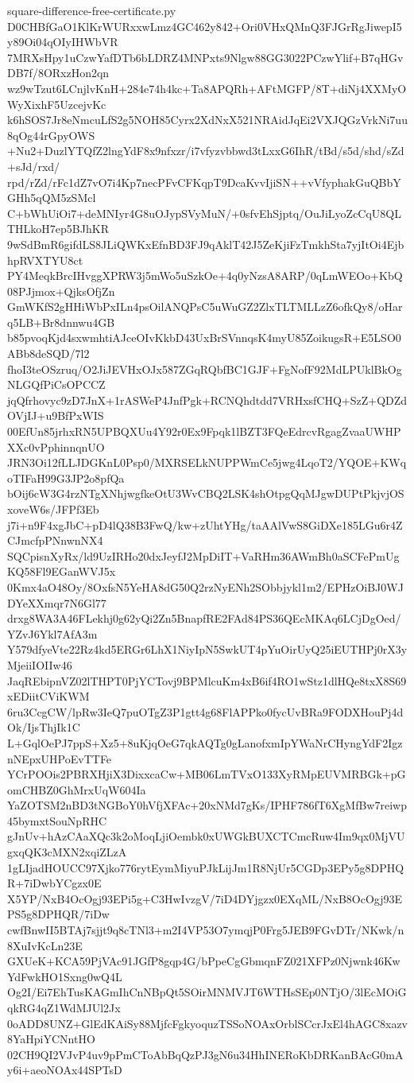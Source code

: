 \documentclass[11pt]{article}
\theoremstyle{definition}
\theoremstyle{remark}
\begin{document}
\begin{filecontents*}[overwrite]{square-difference-free-certificate.py}
D0CHBfGaO1KlKrWURxxwLmz4GC462y842+Ori0VHxQMnQ3FJGrRgJiwepI5y89Oi04qOIyIHWbVR
7MRXsHpy1uCzwYafDTb6bLDRZ4MNPxts9Nlgw88GG3022PCzwYlif+B7qHGvDB7f/8ORxzHon2qn
wz9wTzut6LCnjlvKnH+284e74h4kc+Ta8APQRh+AFtMGFP/8T+diNj4XXMyOWyXixhF5UzcejvKc
k6hSOS7Jr8eNmcuLfS2g5NOH85Cyrx2XdNxX521NRAidJqEi2VXJQGzVrkNi7uu8qOg44rGpyOWS
+Nu2+DuzlYTQfZ2lngYdF8x9nfxzr/i7vfyzvbbwd3tLxxG6IhR/tBd/s5d/shd/sZd+sJd/rxd/
rpd/rZd/rFc1dZ7vO7i4Kp7necPFvCFKqpT9DcaKvvIjiSN++vVfyphakGuQBbYGHh5qQM5zSMcl
C+bWhUiOi7+deMNIyr4G8uOJypSVyMuN/+0sfvEhSjptq/OuJiLyoZcCqU8QLTHLkoH7ep5BJhKR
9wSdBmR6gifdLS8JLiQWKxEfnBD3FJ9qAklT42J5ZeKjiFzTmkhSta7yjItOi4EjbhpRVXTYU8ct
PY4MeqkBrcIHvggXPRW3j5mWo5uSzkOe+4q0yNzsA8ARP/0qLmWEOo+KbQ08PJjmox+QjksOfjZn
GmWKfS2gHHiWbPxILn4psOilANQPsC5uWuGZ2ZlxTLTMLLzZ6ofkQy8/oHarq5LB+Br8dnnwu4GB
b85pvoqKjd4sxwmhtiAJceOIvKkbD43UxBrSVnnqsK4myU85ZoikugsR+E5LSO0ABb8deSQD/7l2
fhoI3teOSzruq/O2JiJEVHxOJx587ZGqRQbfBC1GJF+FgNofF92MdLPUklBkOgNLGQfPiCsOPCCZ
jqQfrhovyc9zD7JnX+1rASWeP4JnfPgk+RCNQhdtdd7VRHxsfCHQ+SzZ+QDZdOVjIJ+u9BfPxWIS
00EfUn85jrhxRN5UPBQXUu4Y92r0Ex9Fpqk1lBZT3FQeEdrcvRgagZvaaUWHPXXc0vPphinnqnUO
JRN3Oi12fLLJDGKnL0Psp0/MXRSELkNUPPWmCe5jwg4LqoT2/YQOE+KWqoTIFaH99G3JP2o8pfQa
bOij6cW3G4rzNTgXNhjwgfkeOtU3WvCBQ2LSK4shOtpgQqMJgwDUPtPkjvjOSxoveW6s/JFPf3Eb
j7i+n9F4xgJbC+pD4lQ38B3FwQ/kw+zUhtYHg/taAAlVwS8GiDXe185LGu6r4ZCJmcfpPNnwnNX4
SQCpisnXyRx/ld9UzIRHo20dxJeyfJ2MpDiIT+VaRHm36AWmBh0aSCFePmUgKQ58Fl9EGanWVJ5x
0Kmx4aO48Oy/8OxfsN5YeHA8dG50Q2rzNyENh2SObbjykl1m2/EPHzOiBJ0WJDYeXXmqr7N6Gl77
drxg8WA3A46FLekhj0g62yQi2Zn5BnapfRE2FAd84PS36QEcMKAq6LCjDgOed/YZvJ6Ykl7AfA3m
Y579dfyeVte22Rz4kd5ERGr6LhX1NiyIpN5SwkUT4pYuOirUyQ25iEUTHPj0rX3yMjeiiIOIIw46
JaqREbipnVZ02lTHPT0PjYCTovj9BPMlcuKm4xB6if4RO1wStz1dlHQe8txX8S69xEDiitCViKWM
6ru3CcgCW/lpRw3IeQ7puOTgZ3P1gtt4g68FlAPPko0fycUvBRa9FODXHouPj4dOk/IjsThjIk1C
L+GqlOePJ7ppS+Xz5+8uKjqOeG7qkAQTg0gLanofxmIpYWaNrCHyngYdF2IgznNEpxUHPoEvTTFe
YCrPOOis2PBRXHjiX3DixxcaCw+MB06LmTVxO133XyRMpEUVMRBGk+pGomCHBZ0GhMrxUqW604Ia
YaZOTSM2nBD3tNGBoY0hVfjXFAc+20xNMd7gKs/IPHF786fT6XgMfBw7reiwp45bymxtSouNpRHC
gJnUv+hAzCAaXQc3k2oMoqLjiOembk0xUWGkBUXCTCmcRuw4Im9qx0MjVUgxqQK3cMXN2xqiZLzA
1gLIjadHOUCC97Xjko776rytEymMiyuPJkLijJm1R8NjUr5CGDp3EPy5g8DPHQR+7iDwbYCgzx0E
X5YP/NxB4OcOgj93EPi5g+C3HwIvzgV/7iD4DYjgzx0EXqML/NxB8OcOgj93EPS5g8DPHQR/7iDw
cwfBnwII5BTAj7sjjt9q8cTNl3+m2I4VP53O7ymqjP0Frg5JEB9FGvDTr/NKwk/n8XuIvKcLn23E
GXUeK+KCA59PjVAc91JGfP8gqp4G/bPpeCgGbmqnFZ021XFPz0Njwnk46KwYdFwkHO1Sxng0wQ4L
Og2I/Ei7EhTusKAGmIhCnNBpQt5SOirMNMVJT6WTHsSEp0NTjO/3lEcMOiGqkRG4qZ1WdMJUl2Jx
0oADD8UNZ+GlEdKAiSy88MjfcFgkyoquzTSSoNOAxOrblSCcrJxEl4hAGC8xazv8YaHpiYCNntHO
02CH9QI2VJvP4uv9pPmCToAbBqQzPJ3gN6u34HhINERoKbDRKanBAcG0mAy6i+aeoNOAx44SPTsD

\end{filecontents*}
\end{document}
